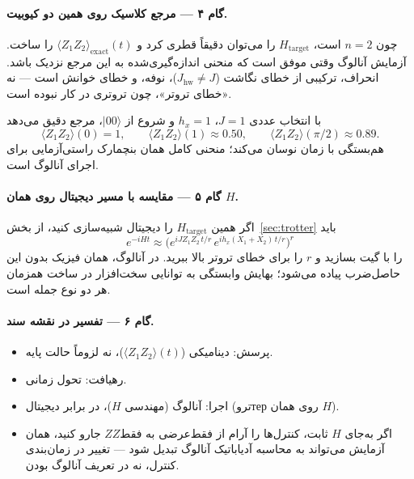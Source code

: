 \paragraph{گام ۴ --- مرجع کلاسیک روی همین دو کیوبیت.}
چون $n=2$ است، $H_{\mathrm{target}}$ را می‌توان دقیقاً قطری کرد و $\langle Z_1 Z_2\rangle_{\mathrm{exact}}(t)$ را ساخت. آزمایش آنالوگ وقتی موفق است که منحنی اندازه‌گیری‌شده به این مرجع نزدیک باشد. انحراف، ترکیبی از خطای نگاشت ($J_{\mathrm{hw}}\neq J$)، نوفه، و خطای خوانش است --- نه «خطای تروتر»، چون تروتری در کار نبوده است.

با انتخاب عددی $J=1$، $h_x=1$ و شروع از $\lvert00\rangle$، مرجع دقیق می‌دهد
\begin{equation}
	\langle Z_1 Z_2\rangle(0)=1,
	\qquad
	\langle Z_1 Z_2\rangle(1)\approx 0.50,
	\qquad
	\langle Z_1 Z_2\rangle(\pi/2)\approx 0.89.
\end{equation}
هم‌بستگی با زمان نوسان می‌کند؛ منحنی کامل همان بنچمارک راستی‌آزمایی برای اجرای آنالوگ است.

\paragraph{گام ۵ --- مقایسه با مسیر دیجیتال روی همان $H$.}
اگر همین $H_{\mathrm{target}}$ را دیجیتال شبیه‌سازی کنید، از بخش~\ref{sec:trotter} باید
\begin{equation}
	e^{-iHt}
	\approx
	\bigl(e^{iJ Z_1Z_2\,t/r}\,e^{i h_x(X_1+X_2)\,t/r}\bigr)^{r}
\end{equation}
را با گیت بسازید و $r$ را برای خطای تروتر بالا ببرید. در آنالوگ، همان فیزیک بدون این حاصل‌ضرب پیاده می‌شود؛ بهایش وابستگی به توانایی سخت‌افزار در ساخت همزمان هر دو نوع جمله است.

\paragraph{گام ۶ --- تفسیر در نقشه سند.}
\begin{itemize}
	\item پرسش: دینامیکی ($\langle Z_1Z_2\rangle(t)$)، نه لزوماً حالت پایه.
	\item رهیافت: تحول زمانی.
	\item اجرا: آنالوگ (مهندسی $H$)، در برابر دیجیتال (تروтер روی همان $H$).
	\item اگر به‌جای $H$ ثابت، کنترل‌ها را آرام از فقط‌عرضی به فقط‌$ZZ$ جارو کنید، همان آزمایش می‌تواند به محاسبه آدیاباتیک آنالوگ تبدیل شود --- تغییر در زمان‌بندی کنترل، نه در تعریف آنالوگ بودن.
\end{itemize}

